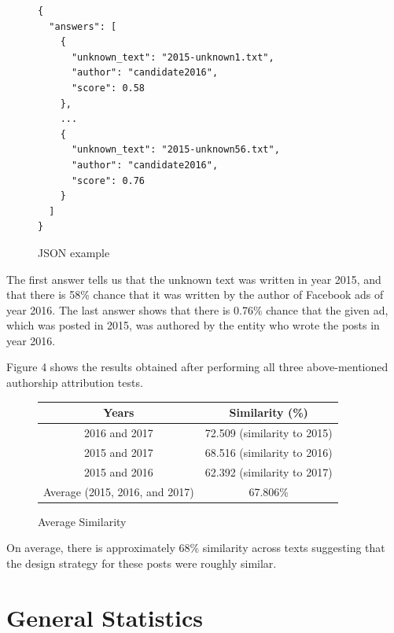 \documentclass[11pt]{article}
\begin{document}
\begin{figure}[H]
\begin{verbatim}
{
  "answers": [
    {
      "unknown_text": "2015-unknown1.txt",
      "author": "candidate2016",
      "score": 0.58
    },
    ...
    {
      "unknown_text": "2015-unknown56.txt",
      "author": "candidate2016",
      "score": 0.76
    }
  ]
}
\end{verbatim}
\caption{JSON example}
\end{figure}

The first answer tells us that the unknown text was written in year 2015, and
that there is 58\% chance that it was written by the author of Facebook ads
of year 2016. The last answer shows that there is 0.76\% chance that the given
ad, which was posted in 2015, was authored by the entity who wrote the posts in
year 2016.

\bigskip

Figure 4 shows the results obtained after performing all three above-mentioned
authorship attribution tests.

\begin{figure}[H]
  \centering
  \begin{tabular}{*{2}{c}}
    \toprule
    Years & Similarity (\%)\\
    \midrule
    2016 and 2017 & 72.509 (similarity to 2015)\\
    \midrule
    2015 and 2017 & 68.516 (similarity to 2016)\\
    \midrule
    2015 and 2016 & 62.392 (similarity to 2017)\\
    \midrule
    Average (2015, 2016, and 2017) & 67.806\%\\
    \bottomrule
  \end{tabular}
  \caption{Average Similarity}
\end{figure}

On average, there is approximately 68\% similarity across texts suggesting that
the design strategy for these posts were roughly similar.


\section*{\centering General Statistics}
\end{document}
